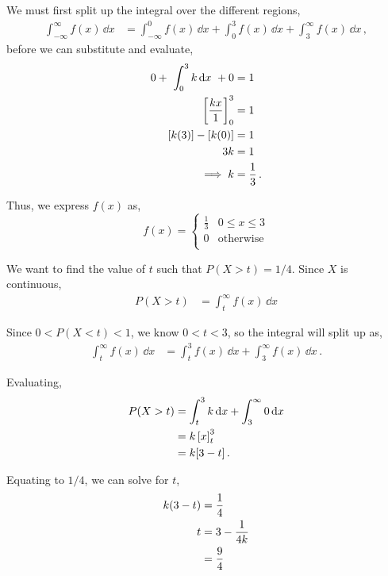 \begin{subquestions}
\begin{subsubquestions}
We must first split up the integral over the different regions,
\begin{align}
		\int_{-\infty}^{\infty} f(x) \, \dd x &= \int_{-\infty}^{0} f(x)\,\dd x  + \int_{0}^{3} f(x)\,\dd x + \int_{3}^{\infty} f(x)\,\dd x \,,
\end{align}
before we can substitute and evaluate,
\begin{align}
	0 + ~\int_{0}^{3} k\,\mathrm{d} x ~+ 0 & = 1 \, \nonumber \\
	\left[\frac{kx}{1} \right]_0^3 & = 1 \, \nonumber \\
	[k(3)]-[k(0)] & = 1 \, \nonumber \\
	3k & = 1 \, \nonumber \\
	\implies k & = \frac{1}{3} \,.
\end{align}

Thus, we express $f(x)$ as,
\begin{equation}
f(x) =
\begin{cases}
	\frac{1}{3} & \text{$0 \leq x \leq 3$} \\
	0    & \text{otherwise} \\
\end{cases}
\end{equation}

\subsubquestion

We want to find the value of $t$ such that $P(X > t) = 1/4$. Since $X$ is continuous,
\begin{align}
	P(X >t) &= \int_t^\infty f(x) \,\dd x 
\end{align}

Since $0< P(X<t) < 1$, we know $0<t<3$, so the integral will split up as,
\begin{align}
	\int_t^\infty f(x) \,\dd x &= \int_t^3 f(x)\,\dd x + \int_3^\infty f(x) \,\dd x \,.
\end{align}

Evaluating,
\begin{align}
	P(X >t) &= \int_t^3 k \,\mathrm{d} x + \int_3^\infty 0\,\mathrm{d} x \nonumber\\
	&= k\left[x\right]_t^3 \nonumber\\
	&= k [3-t]\,.
\end{align}

Equating to $1/4$, we can solve for $t$,
\begin{align}
	k (3-t) &= \frac{1}{4} \nonumber\\
	t &= 3 - \frac{1}{4k} \nonumber\\
	  &= \frac{9}{4}
\end{align}


\end{subsubquestions}
\end{subquestions}
